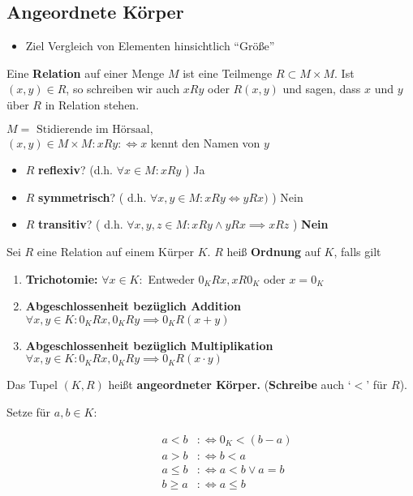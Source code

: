 \subsection{Angeordnete Körper}
\begin{itemize}
	\item Ziel Vergleich von Elementen hinsichtlich ``Größe''
\end{itemize}
\begin{subdefinition}
	Eine \textbf{Relation} auf einer Menge $M$ ist eine Teilmenge $ R\subset M\times M $. Ist $ ( x, y ) \in R $, so schreiben wir auch $xRy$ oder $ R(x,y) $ und sagen, dass $x $ und $ y $ über $ R $ in Relation stehen.
\end{subdefinition}
\begin{subexample}
	$ M = \text{ Stidierende im Hörsaal,}$\\
	$ (x,y) \in M \times M : x R y :\iff x $ kennt den Namen von $ y $
	\begin{itemize}
		\item $ R $ \textbf{reflexiv}? (d.h. $\forall x \in M : x R y $ ) \qquad Ja
		\item $ R $ \textbf{symmetrisch}? ( d.h. $\forall x, y \in M : x R y \iff y R x ) $ ) \qquad Nein
		\item $ R $ \textbf{transitiv}? ( d.h. $ \forall x, y, z \in M : xRy \wedge yRx \implies xRz $ ) \qquad \textbf{Nein}
	\end{itemize}
\end{subexample}
\begin{subdefinition}
	Sei $ R $ eine Relation auf einem Kürper $ K $. $ R $ heiß \textbf{Ordnung} auf $ K $, falls gilt
	\begin{enumerate}[label=(\roman*)]
		\item \textbf{Trichotomie:} $ \forall x \in K: $ Entweder $ 0_K Rx, x R0_K $ oder $ x = 0_K $
		\item \textbf{Abgeschlossenheit bezüglich Addition} $ \forall x,y \in K : 0_K R x, 0_K R y \implies 0_K R (x+y)$
		\item \textbf{Abgeschlossenheit bezüglich Multiplikation} $ \forall x, y \in K: 0_K R x, 0_KRy \implies 0_K R (x\cdot y) $
	\end{enumerate}
	Das Tupel $ ( K, R ) $ heißt \textbf{angeordneter Körper.} (\textbf{Schreibe} auch `$<$' für  $ R $).
	\begin{description}
		\item[Setze für $a,b \in K $:]
			\begin{align*}
				a < b &:\iff 0_K < ( b- a )\\
				a > b &:\iff b < a\\
				a \leq b &:\iff a < b \vee a = b\\
				b \geq a &:\iff a \leq b\\
			\end{align*}
	\end{description}
\end{subdefinition}

